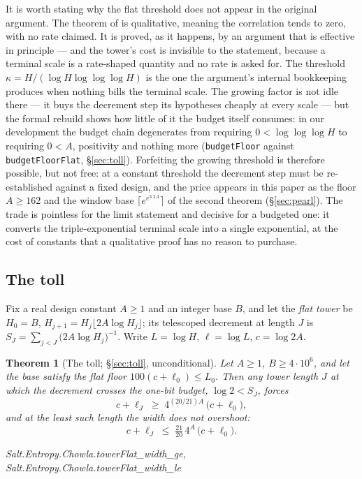 \documentclass[11pt]{amsart}
\newcommand{\leanname}[1]{\par{\noindent\small\ttfamily\raggedright #1\par}}
\newcommand{\leaninline}[1]{{\small\texttt{#1}}}
\newtheorem{theorem}{Theorem}[section]
\theoremstyle{remark}
\begin{document}
It is worth stating why the flat threshold does not appear in the
original argument. The theorem of \cite{TaoChowla} is qualitative,
meaning the correlation tends to zero, with no rate claimed. It is
proved, as it happens, by an argument that is effective in principle ---
and the tower's cost is invisible to the statement, because a terminal
scale is a rate-shaped quantity and no rate is asked for. The threshold
$\kappa = H/(\log H\log\log\log H)$ is the one the argument's internal
bookkeeping produces when nothing bills the terminal scale. The growing
factor is not idle there --- it buys the decrement step its hypotheses
cheaply at every scale --- but the formal rebuild shows how little of it
the budget itself consumes: in our development the budget chain
degenerates from requiring $0 < \log\log\log H$ to requiring $0 < A$,
positivity and nothing more (\leaninline{budgetFloor} against
\leaninline{budgetFloorFlat}, \S\ref{sec:toll}). Forfeiting the growing
threshold is therefore possible, but not free: at a constant threshold
the decrement step must be re-established against a fixed design, and
the price appears in this paper as the floor $A \ge 162$ and the window
base $\lceil e^{e^{3.2A}}\rceil$ of the second theorem
(\S\ref{sec:pearl}). The trade is pointless for the limit statement and
decisive for a budgeted one: it converts the triple-exponential terminal
scale into a single exponential, at the cost of constants that a
qualitative proof has no reason to purchase.

\subsection{The toll}
Fix a real design constant $A \ge 1$ and an integer base $B$, and let the
\emph{flat tower} be $H_0 = B$, $H_{j+1} = H_j\lfloor 2A\log H_j\rfloor$;
its telescoped decrement at length $J$ is
$S_J = \sum_{j<J} \bigl(2A\log H_j\bigr)^{-1}$. Write $L = \log H$,
$\ell = \log L$, $c = \log 2A$.

\begin{theorem}[The toll; \S\ref{sec:toll}, unconditional]\label{thm:toll-intro}
Let $A \ge 1$, $B \ge 4\cdot 10^{6}$, and let the base satisfy the flat
floor $100(c + \ell_0) \le L_0$. Then any tower length $J$ at which the
decrement crosses the one-bit budget, $\log 2 < S_J$, forces
\[
c + \ell_J \;\ge\; 4^{(20/21)A}\,\bigl(c + \ell_0\bigr),
\]
and at the least such length the width does not overshoot:
\[
c + \ell_{J} \;\le\; \tfrac{21}{20}\,4^{A}\,\bigl(c + \ell_0\bigr).
\]
\leanname{Salt.Entropy.Chowla.towerFlat\_width\_ge,
Salt.Entropy.Chowla.towerFlat\_width\_le}
\end{theorem}
\end{document}

